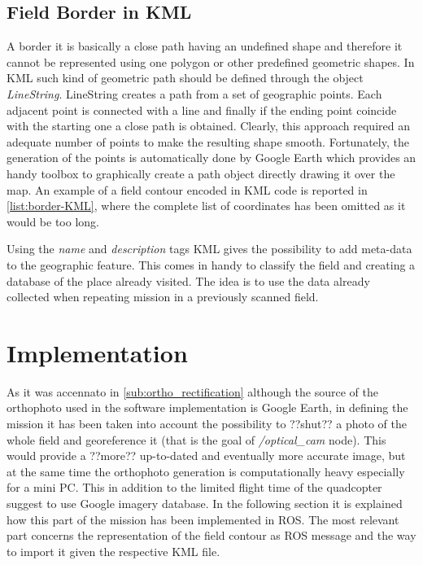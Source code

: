 
\subsection{Field Border in KML} %
\label{sub:field_border_in_kml}
A border it is basically a close path having an undefined shape and therefore it cannot be represented using one polygon or other predefined geometric shapes. In KML such kind of geometric path should be defined through the object \textit{LineString}. LineString creates a path from a set of geographic points. Each adjacent point is connected with a line and finally if the ending point coincide with the starting one a close path is obtained. Clearly, this approach required an adequate number of points to make the resulting shape smooth. Fortunately, the generation of the points is automatically done by Google Earth which provides an handy toolbox to graphically create a path object directly drawing it over the map.
An example of a field contour encoded in KML code is reported in \autoref{list:border-KML}, where the complete list of coordinates has been omitted as it would be too long.



Using the \textit{name} and \textit{description} tags KML gives the possibility to add meta-data to the geographic feature. This comes in handy to classify the field and creating a database of the place already visited. The idea is to use the data already collected when repeating mission in a previously scanned field.


\section{Implementation} %
\label{sec:implementation}
As it was accennato in \ref{sub:ortho_rectification} although the source of the orthophoto used in the software implementation is Google Earth, in defining the mission it has been taken into account the possibility to ??shut?? a photo of the whole field and georeference it (that is the goal of \textit{/optical\_cam} node). This would provide a ??more?? up-to-dated and eventually more accurate image, but at the same time the orthophoto generation is computationally heavy especially for a mini PC. This in addition to the limited flight time of the quadcopter suggest to use Google imagery database.
In the following section it is explained how this part of the mission has been implemented in ROS. The most relevant part concerns the representation of the field contour as ROS message and the way to import it given the respective KML file.

